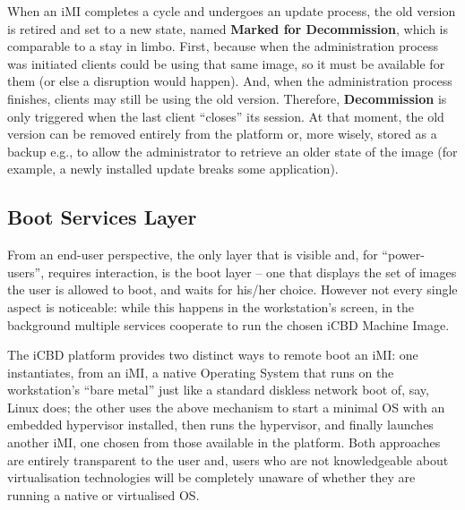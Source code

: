 When an iMI completes a cycle and undergoes an update process, the old version is retired and set to a new state, named \textbf{Marked for Decommission}, which is comparable to a stay in limbo. First, because when the administration process was initiated clients could be using that same image, so it must be available for them (or else a disruption would happen). And, when the administration process finishes, 
clients may still be using the old version. Therefore, \textbf{Decommission} is only triggered when the last client “closes” its session. At that moment, the old version can be removed entirely from the platform or, more wisely, stored as a backup e.g., to allow the administrator to retrieve an older state of the image (for example, a newly installed update breaks some application).




\subsection{Boot Services Layer}
\label{sub:icbd_boot_layer}

From an end-user perspective, the only layer that is visible and, for “power-users”, requires interaction, is the boot layer – one that displays the set of images the user is allowed to boot, and waits for his/her choice. However not every single aspect is noticeable: while this happens in the workstation’s screen, in the background multiple services cooperate to run the chosen iCBD Machine Image.

The iCBD platform provides two distinct ways to remote boot an iMI: one instantiates, from an iMI, a native Operating System that runs on the workstation’s “bare metal” just like a standard diskless network boot of, say, Linux does; the other uses the above mechanism to start a minimal OS with an embedded hypervisor installed, then runs the hypervisor, and finally launches another iMI, one chosen from those available in the platform. Both approaches are entirely transparent to the user and, users who are not knowledgeable about virtualisation technologies will be completely unaware of whether they are running a native or virtualised OS.


